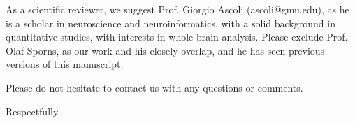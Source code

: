 \documentclass[10pt]{letter}
\begin{document}
\begin{letter}{	%
}
As a scientific reviewer, we suggest Prof. Giorgio Ascoli (ascoli@gmu.edu), as he is a scholar in neuroscience and neuroinformatics, with a solid background in quantitative studies, with interests in whole brain analysis.  Please exclude Prof. Olaf Sporns, as our work and his closely overlap, and he has seen previous versions of this manuscript. 

Please do not hesitate to contact us with any questions or comments.

\closing{Respectfully,}



\end{letter}
\end{document}
